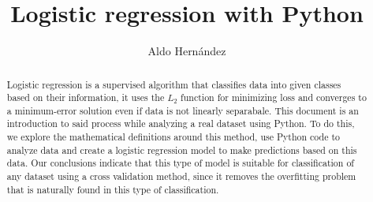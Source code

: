 \documentclass[10pt]{article}
\begin{document}
\begin{opening}
  \title{Logistic regression with Python}
  \author[Universidad Autónoma de Nuevo León, San Nicolás de los Garza, aldo.hernandezt@uanl.edu.mx]{Aldo Hernández}

  \begin{abstract}
    Logistic regression is a supervised algorithm that classifies data into given classes based on their information, it uses the $L_{2}$ function for minimizing loss and converges to a minimum-error solution even if data is not linearly separabale. This document is an introduction to said process while analyzing a real dataset using Python. To do this, we explore the mathematical definitions around this method, use Python code to analyze data and create a logistic regression model to make predictions based on this data. Our conclusions indicate that this type of model is suitable for classification of any dataset using a cross validation method, since it removes the overfitting problem that is naturally found in this type of classification.
  \end{abstract}

\end{opening}
\end{document}
